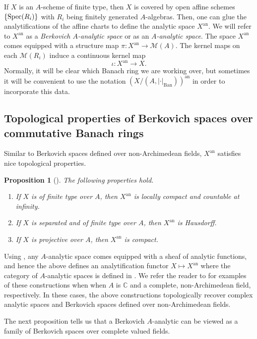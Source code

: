 \documentclass[11pt,reqno]{amsart}
\newcommand{\mC}{\mathbb{C}}
\newcommand{\sM}{{\mathscr M}}
\theoremstyle{theorem}
\numberwithin{equation}{subsection}
\newtheorem{prop}[subsubsection]{Proposition}
\numberwithin{equation}{subsection}
\theoremstyle{definition}
\theoremstyle{remark}
\numberwithin{equation}{subsubsection} \numberwithin{figure}{section}
\DeclareMathOperator{\an}{an}
\newcommand{\cdef}[1]{\textsf{\textit{#1}}}
\DeclareMathOperator{\Ban}{Ban}
\begin{document}
If $X$ is an $A$-scheme of finite type, then $X$ is covered by open affine schemes $\{ \operatorname{Spec}(R_i)\}$ with $R_i$ being finitely generated $A$-algebras. 
Then, one can glue the analytifications of the affine charts to define the analytic space $X^{\an}$.
We will refer to $X^{\an}$ as a \cdef{Berkovich $A$-analytic space} or as an \cdef{$A$-analytic space}.
The space $X^{\an}$ comes equipped with a structure map $\pi\colon X^{\an} \to \sM(A)$. The kernel maps on each $\sM(R_i)$ induce a continuous kernel map 
\[
\iota\colon X^{\an} \to X.
\] 
Normally, it will be clear which Banach ring we are working over, but sometimes it will be convenient to use the notation $(X/(A,|\cdot|_{\Ban}))^{\an}$ in order to incorporate this data. 

\subsection{Topological properties of Berkovich spaces over commutative Banach rings}
Similar to Berkovich spaces defined over non-Archimedean fields, $X^{\an}$ satisfies nice topological properties. 

\begin{prop}[]\label{prop:Berkovichproperties}
The following properties hold.
\begin{enumerate}
\item If $X$ is of finite type over $A$, then $X^{\an}$ is locally compact and countable at infinity.
\item If $X$ is separated and of finite type over $A$, then $X^{\an}$ is Hausdorff.
\item If $X$ is projective over $A$, then $X^{\an}$ is compact. 
\end{enumerate}
\end{prop}

Using \cite[Definition 1.5.3]{BerkovichSpectral}, any $A$-analytic space comes equipped with a sheaf of analytic functions, and hence the above defines an analytification functor $X \mapsto X^{\an}$ where the category of $A$-analytic spaces is defined in \cite{LemanissierPoineau:BerkZ}. We refer the reader to \cite[Examples 1.5 \& 1.6]{PilleSchneider:Global} for examples of these constructions when when $A$ is $\mC$ and a complete, non-Archimedean field, respectively. 
In these cases, the above constructions topologically recover complex analytic spaces and Berkovich spaces defined over non-Archimedean fields. 

The next proposition tells us that a Berkovich $A$-analytic can be viewed as a family of Berkovich spaces over complete valued fields. 
\end{document}

